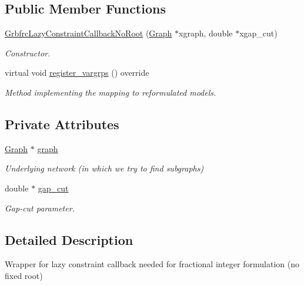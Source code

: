 \subsection*{Public Member Functions}
\begin{DoxyCompactItemize}
\item 
\hyperlink{classderegnet_1_1GrbfrcLazyConstraintCallbackNoRoot_a89ebb5a3dfa9156849b68adf27d86c02}{Grbfrc\+Lazy\+Constraint\+Callback\+No\+Root} (\hyperlink{namespacederegnet_a55b76c55bbabc682cbc61f8b9948799e}{Graph} $\ast$xgraph, double $\ast$xgap\+\_\+cut)
\begin{DoxyCompactList}\small\item\em Constructor. \end{DoxyCompactList}\item 
virtual void \hyperlink{classderegnet_1_1GrbfrcLazyConstraintCallbackNoRoot_a4e6595d467c68a9b94f393991df04bbd}{register\+\_\+vargrps} () override
\begin{DoxyCompactList}\small\item\em Method implementing the mapping to reformulated models. \end{DoxyCompactList}\end{DoxyCompactItemize}
\subsection*{Private Attributes}
\begin{DoxyCompactItemize}
\item 
\hyperlink{namespacederegnet_a55b76c55bbabc682cbc61f8b9948799e}{Graph} $\ast$ \hyperlink{classderegnet_1_1GrbfrcLazyConstraintCallbackNoRoot_a0c5b7bfa966879cc74fea0ea1c5c864c}{graph}
\begin{DoxyCompactList}\small\item\em Underlying network (in which we try to find subgraphs) \end{DoxyCompactList}\item 
double $\ast$ \hyperlink{classderegnet_1_1GrbfrcLazyConstraintCallbackNoRoot_ac8425029e6bb6929bc08c261f203cccf}{gap\+\_\+cut}
\begin{DoxyCompactList}\small\item\em Gap-\/cut parameter. \end{DoxyCompactList}\end{DoxyCompactItemize}


\subsection{Detailed Description}
Wrapper for lazy constraint callback needed for fractional integer formulation (no fixed root) 

